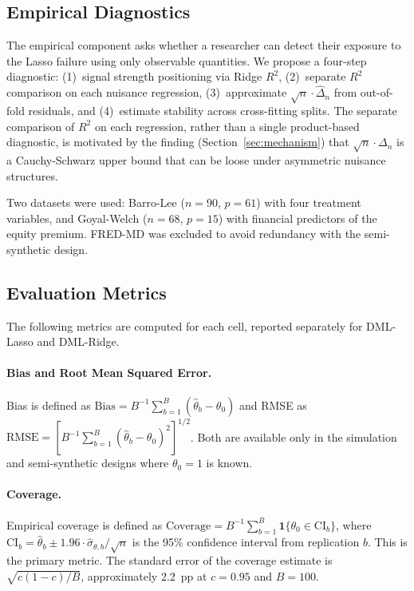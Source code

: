 \documentclass[a4paper,10.5pt]{article}
\begin{document}
\subsection{Empirical Diagnostics}\label{sec:empirical_design}

The empirical component asks whether a researcher can detect their exposure to the Lasso failure using only observable quantities. We propose a four-step diagnostic: (1)~signal strength positioning via Ridge $R^2$, (2)~separate $R^2$ comparison on each nuisance regression, (3)~approximate $\sqrt{n}\cdot\hat{\Delta}_n$ from out-of-fold residuals, and (4)~estimate stability across cross-fitting splits. The separate comparison of $R^2$ on each regression, rather than a single product-based diagnostic, is motivated by the finding (Section~\ref{sec:mechanism}) that $\sqrt{n}\cdot\Delta_n$ is a Cauchy-Schwarz upper bound that can be loose under asymmetric nuisance structures.

Two datasets were used: Barro-Lee ($n = 90$, $p = 61$) with four treatment variables, and Goyal-Welch \citep{goyal2008} ($n = 68$, $p = 15$) with financial predictors of the equity premium. FRED-MD was excluded to avoid redundancy with the semi-synthetic design.


\subsection{Evaluation Metrics}\label{sec:metrics}

The following metrics are computed for each cell, reported separately for DML-Lasso and DML-Ridge.

\paragraph{Bias and Root Mean Squared Error.} Bias is defined as $\text{Bias} = B^{-1}\sum_{b=1}^{B}(\hat{\theta}_b - \theta_0)$ and RMSE as $\text{RMSE} = [B^{-1}\sum_{b=1}^{B}(\hat{\theta}_b - \theta_0)^2]^{1/2}$. Both are available only in the simulation and semi-synthetic designs where $\theta_0 = 1$ is known.

\paragraph{Coverage.} Empirical coverage is defined as $\text{Coverage} = B^{-1}\sum_{b=1}^{B}\mathbf{1}\{\theta_0 \in \text{CI}_b\}$, where $\text{CI}_b = \hat{\theta}_b \pm 1.96 \cdot \hat{\sigma}_{\theta,b} / \sqrt{n}$ is the 95\% confidence interval from replication $b$. This is the primary metric. The standard error of the coverage estimate is $\sqrt{c(1-c)/B}$, approximately 2.2~pp at $c = 0.95$ and $B = 100$.
\end{document}
